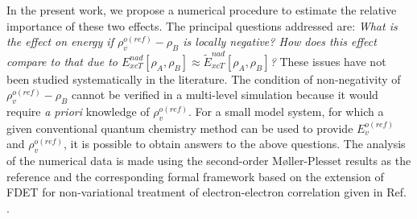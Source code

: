 \documentclass[amsmath,amssymb,preprint,aip,jcp]{revtex4-1}
\begin{document}
In the present work, we propose a numerical procedure to estimate the relative importance of these two effects.
The principal questions addressed are: {\color{red} {\it What is the effect on energy if $\rho_{v}^{o(ref)}-\rho_B$ is locally negative? How does this effect compare to that due to ${E}_{xcT}^{nad}[\rho_A,\rho_B]\approx \tilde{E}_{xcT}^{nad}[\rho_A,\rho_B]$?}} 
These issues have not been studied systematically in the literature.
The condition of non-negativity of $\rho_{v}^{o(ref)}-\rho_B$ cannot be verified in a multi-level simulation because it would require {\it a priori} knowledge of $\rho_{v}^{o(ref)}$. 
{\color{red}
For a small model system, for which a given conventional quantum chemistry method  can be used to provide $E_v^{o(ref)}$ and $\rho_{v}^{o(ref)}$, it is possible to obtain answers to the above questions.
The analysis of the numerical data is made using the second-order M{\o}ller-Plesset results as the reference %
and the corresponding formal framework based on the extension of FDET for non-variational treatment of electron-electron correlation given in Ref. .}
\end{document}
